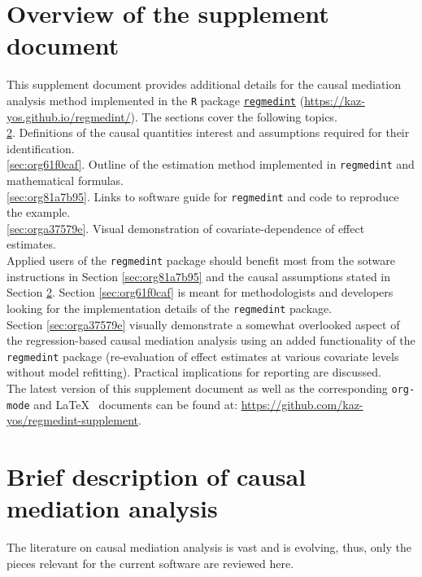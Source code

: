 \documentclass[dvipdfmx,10pt]{article}
\date{\today}
\title{}
\begin{document}
\tableofcontents

\sloppy
\setcounter{page}{0}
\newpage
\setcounter{section}{-1}
\section{Overview of the supplement document}
\label{sec:org5f03e68}

This supplement document provides additional details for the causal mediation analysis method implemented in the \texttt{R} package \href{https://kaz-yos.github.io/regmedint/}{\texttt{regmedint}} (\url{https://kaz-yos.github.io/regmedint/}). The sections cover the following topics.\\

\ref{sec:orgbd80327}. Definitions of the causal quantities interest and assumptions required for their identification.\\
\ref{sec:org61f0caf}. Outline of the estimation method implemented in \texttt{regmedint} and mathematical formulas.\\
\ref{sec:org81a7b95}. Links to software guide for \texttt{regmedint} and code to reproduce the example.\\
\ref{sec:orga37579e}. Visual demonstration of covariate-dependence of effect estimates.\\

Applied users of the \texttt{regmedint} package should benefit most from the sotware instructions in Section \ref{sec:org81a7b95} and the causal assumptions stated in Section \ref{sec:orgbd80327}. Section \ref{sec:org61f0caf} is meant for methodologists and developers looking for the implementation details of the \texttt{regmedint} package.\\

Section \ref{sec:orga37579e} visually demonstrate a somewhat overlooked aspect of the regression-based causal mediation analysis using an added functionality of the \texttt{regmedint} package (re-evaluation of effect estimates at various covariate levels without model refitting). Practical implications for reporting are discussed.\\

The latest version of this supplement document as well as the corresponding \texttt{org-mode} and \LaTeX ~ documents can be found at: \url{https://github.com/kaz-yos/regmedint-supplement}.


\section{Brief description of causal mediation analysis}
\label{sec:orgbd80327}
The literature on causal mediation analysis is vast \cite{vanderweeleExplanationCausalInference2015} and is evolving, thus, only the pieces relevant for the current software are reviewed here.
\end{document}
